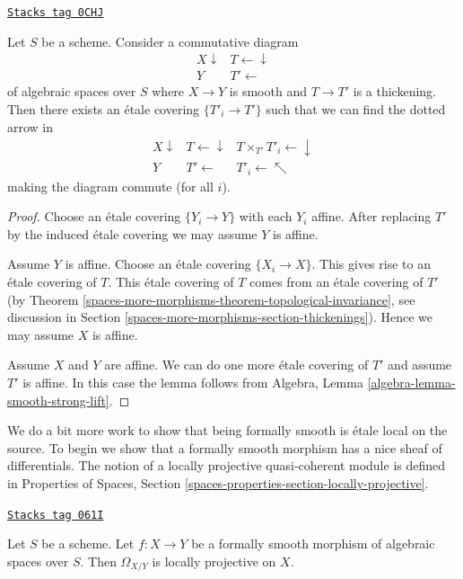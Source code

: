 \begin{lemma}
\label{spaces-more-morphisms-lemma-smooth-strong-lift}
\href{https://stacks.math.columbia.edu/tag/0CHJ}{\texttt{Stacks tag 0CHJ}}

Let $S$ be a scheme. Consider a commutative diagram
$$
\begin{array}{cc}X \downarrow & T \longleftarrow\downarrow \\ Y & T' \longleftarrow\end{array}
$$
of algebraic spaces over $S$ where $X \to Y$ is smooth
and $T \to T'$ is a thickening. Then there exists an
\'etale covering $\{T'_i \to T'\}$ such that we
can find the dotted arrow in
$$
\begin{array}{ccc}X \downarrow & T \longleftarrow\downarrow & T \times_{T'} T'_i \longleftarrow\downarrow \\ Y & T' \longleftarrow & T'_i \longleftarrow\nwarrow\end{array}
$$
making the diagram commute (for all $i$).
\end{lemma}

\begin{proof}
Choose an \'etale covering $\{Y_i \to Y\}$ with each $Y_i$ affine.
After replacing $T'$ by the induced \'etale covering we may assume
$Y$ is affine.

\medskip\noindent
Assume $Y$ is affine. Choose an \'etale covering $\{X_i \to X\}$.
This gives rise to an \'etale covering of $T$. This \'etale covering of $T$
comes from an \'etale covering of $T'$
(by Theorem \ref{spaces-more-morphisms-theorem-topological-invariance}, see
discussion in Section \ref{spaces-more-morphisms-section-thickenings}).
Hence we may assume $X$ is affine.

\medskip\noindent
Assume $X$ and $Y$ are affine. We can do one more \'etale covering of
$T'$ and assume $T'$ is affine. In this case the lemma follows from
Algebra, Lemma \ref{algebra-lemma-smooth-strong-lift}.
\end{proof}


We do a bit more work to show that being formally smooth is \'etale local
on the source. To begin we show that a formally smooth morphism has a nice
sheaf of differentials. The notion of a locally projective quasi-coherent
module is defined in
Properties of Spaces,
Section \ref{spaces-properties-section-locally-projective}.

\begin{lemma}
\label{spaces-more-morphisms-lemma-formally-smooth-sheaf-differentials}
\href{https://stacks.math.columbia.edu/tag/061I}{\texttt{Stacks tag 061I}}

Let $S$ be a scheme.
Let $f : X \to Y$ be a formally smooth morphism of algebraic spaces over $S$.
Then $\Omega_{X/Y}$ is locally projective on $X$.
\end{lemma}

